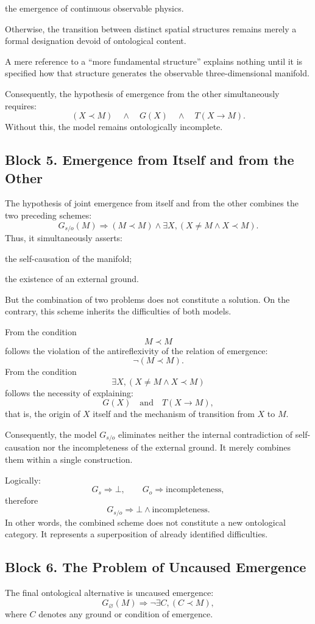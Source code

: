 \documentclass[12pt,a4paper]{article}
\theoremstyle{definition}
\begin{document}
the emergence of continuous observable physics.

Otherwise, the transition between distinct spatial structures remains merely a formal designation devoid of ontological content.

A mere reference to a ``more fundamental structure'' explains nothing until it is specified how that structure generates the observable three-dimensional manifold.

Consequently, the hypothesis of emergence from the other simultaneously requires:
\[
(X\prec M)\quad\land\quad G(X)\quad\land\quad T(X\to M).
\]
Without this, the model remains ontologically incomplete.



\subsection{Block 5. Emergence from Itself and from the Other}
The hypothesis of joint emergence from itself and from the other combines the two preceding schemes:
\[
G_{s/o}(M)
\Rightarrow
(M\prec M)\land \exists X,(X\neq M\land X\prec M).
\]
Thus, it simultaneously asserts:

the self-causation of the manifold;

the existence of an external ground.

But the combination of two problems does not constitute a solution. On the contrary, this scheme inherits the difficulties of both models.

From the condition
\[
M\prec M
\]
follows the violation of the antireflexivity of the relation of emergence:
\[
\neg(M\prec M).
\]
From the condition
\[
\exists X,(X\neq M\land X\prec M)
\]
follows the necessity of explaining:
\[
G(X)
\quad\text{and}\quad
T(X\to M),
\]
that is, the origin of \(X\) itself and the mechanism of transition from \(X\) to \(M\).

Consequently, the model \(G_{s/o}\) eliminates neither the internal contradiction of self-causation nor the incompleteness of the external ground. It merely combines them within a single construction.

Logically:
\[
G_s\Rightarrow\bot,
\qquad
G_o\Rightarrow\text{incompleteness},
\]
therefore
\[
G_{s/o}\Rightarrow \bot\land \text{incompleteness}.
\]
In other words, the combined scheme does not constitute a new ontological category. It represents a superposition of already identified difficulties.



\subsection{Block 6. The Problem of Uncaused Emergence}
The final ontological alternative is uncaused emergence:
\[
G_{\varnothing}(M)
\Rightarrow
\neg\exists C,(C\prec M),
\]
where \(C\) denotes any ground or condition of emergence.
\end{document}
